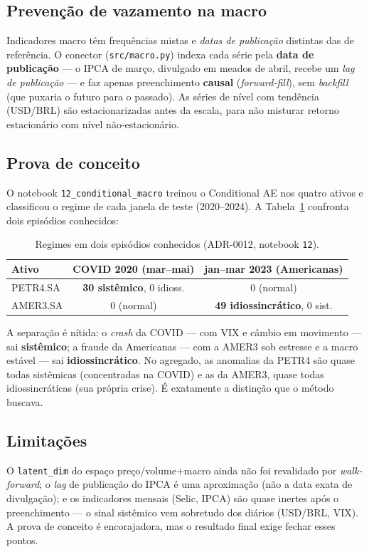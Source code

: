 \subsection{Prevenção de vazamento na macro}
\label{sec:m11-leakage}
Indicadores macro têm frequências mistas e \emph{datas de publicação} distintas das de referência.
O conector (\texttt{src/macro.py}) indexa cada série pela \textbf{data de publicação} --- o IPCA de
março, divulgado em meados de abril, recebe um \emph{lag de publicação} --- e faz apenas
preenchimento \textbf{causal} (\emph{forward-fill}), sem \emph{backfill} (que puxaria o futuro para
o passado). As séries de nível com tendência (USD/BRL) são estacionarizadas antes da escala, para
não misturar retorno estacionário com nível não-estacionário.

\subsection{Prova de conceito}
\label{sec:m11-resultado}
O notebook \texttt{12\_conditional\_macro} treinou o Conditional AE nos quatro ativos e classificou
o regime de cada janela de teste (2020--2024). A Tabela~\ref{tab:m11-prova} confronta dois episódios
conhecidos:

\begin{table}[h]
\centering
\caption{Regimes em dois episódios conhecidos (ADR-0012, notebook \texttt{12}).}
\label{tab:m11-prova}
\begin{tabular}{lcc}
\toprule
\textbf{Ativo} & \textbf{COVID 2020 (mar--mai)} & \textbf{jan--mar 2023 (Americanas)} \\
\midrule
PETR4.SA & \textbf{30 sistêmico}, 0 idioss. & 0 (normal) \\
AMER3.SA & 0 (normal) & \textbf{49 idiossincrático}, 0 sist. \\
\bottomrule
\end{tabular}
\end{table}

\noindent A separação é nítida: o \emph{crash} da COVID --- com VIX e câmbio em movimento --- sai
\textbf{sistêmico}; a fraude da Americanas --- com a AMER3 sob estresse e a macro estável --- sai
\textbf{idiossincrático}. No agregado, as anomalias da PETR4 são quase todas sistêmicas
(concentradas na COVID) e as da AMER3, quase todas idiossincráticas (sua própria crise). É
exatamente a distinção que o método buscava.

\subsection{Limitações}
\label{sec:m11-limitacoes}
O \texttt{latent\_dim} do espaço preço/volume$+$macro ainda não foi revalidado por
\emph{walk-forward}; o \emph{lag} de publicação do IPCA é uma aproximação (não a data exata de
divulgação); e os indicadores mensais (Selic, IPCA) são quase inertes após o preenchimento --- o
sinal sistêmico vem sobretudo dos diários (USD/BRL, VIX). A prova de conceito é encorajadora, mas o
resultado final exige fechar esses pontos.
